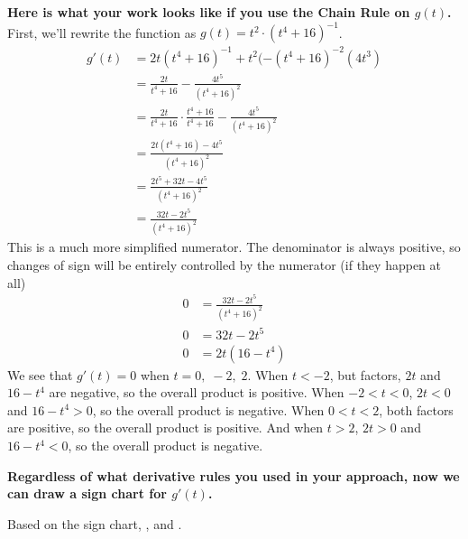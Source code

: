 \documentclass{article}
\begin{document}
\begin{enumerate}
\begin{enumerate}
\begin{solution}
      {\bf Here is what your work looks like if you use the Chain Rule on $g(t)$.} First, we'll rewrite the function as $g(t)=t^2\cdot (t^4+16)^{-1}$.
      \begin{align*}
          g'(t)&= 2t(t^4+16)^{-1}+t^2(-(t^4+16)^{-2}(4t^3)\\
          &=\frac{2t}{t^4+16}-\frac{4t^5}{(t^4+16)^2}\\
          &=\frac{2t}{t^4+16}\cdot\frac{t^4+16}{t^4+16}-\frac{4t^5}{(t^4+16)^2}\\
          &=\frac{2t(t^4+16)-4t^5}{(t^4+16)^2}\\
          &=\frac{2t^5+32t-4t^5}{(t^4+16)^2}\\
          &=\frac{32t-2t^5}{(t^4+16)^2}
      \end{align*}
This is a much more simplified numerator. The denominator is always positive, so changes of sign will be entirely controlled by the numerator (if they happen at all)
\begin{align*}
    0&=\frac{32t-2t^5}{(t^4+16)^2}\\
    0&= 32t-2t^5\\
    0&= 2t(16-t^4)
\end{align*}
We see that $g'(t)=0$ when $t=0,\;-2,\;2$. When $t<-2$, but factors, $2t$ and $16-t^4$ are negative, so the overall product is positive. When $-2<t<0$, $2t<0$ and $16-t^4>0$, so the overall product is negative. When $0<t<2$, both factors are positive, so the overall product is positive. And when $t>2$, $2t>0$ and $16-t^4<0$, so the overall product is negative.
      
      {\bf Regardless of what derivative rules you used in your approach, now we can draw a sign chart for $g'(t)$. }

      \begin{center}
      \end{center}
      Based on the sign chart, , 
      and .
    \end{solution}


\end{enumerate}
\end{enumerate}
\end{document}
